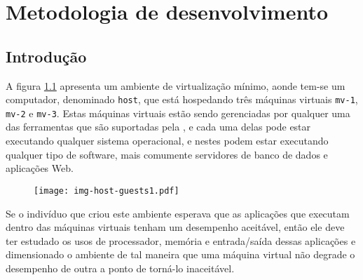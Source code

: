 %
%
%
% 
%
%

\chapter{Metodologia de desenvolvimento}\label{sec:meto}

\section{Introdução}


A figura \ref{fig:hostguests1} apresenta um ambiente de virtualização
mínimo, aonde tem-se um computador, denominado \texttt{host}, que está
hospedando três máquinas virtuais \texttt{mv-1}, \texttt{mv-2} e
\texttt{mv-3}. Estas máquinas virtuais estão sendo gerenciadas por qualquer
uma das ferramentas que são suportadas pela \libvirt{}, e cada uma delas
pode estar executando qualquer sistema operacional, e nestes podem estar
executando qualquer tipo de software, mais comumente servidores de banco de
dados e aplicações Web.

\begin{figure}[htp]
\centering
\texttt{[image: img-host-guests1.pdf]}
\label{fig:hostguests1}
\end{figure}

Se o indivíduo que criou este ambiente esperava que as aplicações que
executam dentro das máquinas virtuais tenham um desempenho aceitável,
então ele deve ter estudado os usos de processador, memória e entrada/saída
dessas aplicações e dimensionado o ambiente de tal maneira que uma máquina
virtual não degrade o desempenho de outra a ponto de torná-lo inaceitável.

